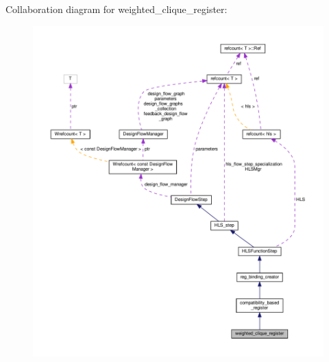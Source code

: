 Collaboration diagram for weighted\+\_\+clique\+\_\+register\+:
\nopagebreak
\begin{figure}[H]
\begin{center}
\leavevmode
\includegraphics[width=350pt]{d8/d77/classweighted__clique__register__coll__graph}
\end{center}
\end{figure}
